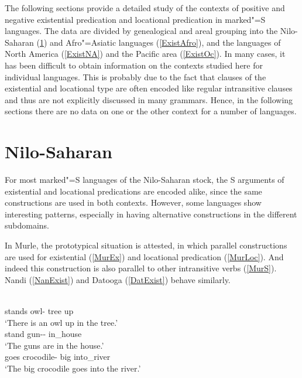 The following sections provide a detailed study of the contexts of positive and negative existential predication and locational predication in marked"=S languages. 
The data are divided by genealogical and areal grouping into the Nilo-Saharan (\ref{ExistNilo}) and Afro"=Asiatic languages (\ref{ExistAfro}), and the languages of North America (\ref{ExistNA}) and the Pacific area (\ref{ExistOc}). 
In many cases, it has been difficult to obtain information on the contexts studied here for individual languages. 
This is probably due to the fact that clauses of the existential and locational type are often encoded like regular intransitive clauses and thus are not explicitly discussed in many grammars. 
Hence, in the following sections there are no data on one or the other context for a number of languages.    

\section{Nilo-Saharan}\label{ExistNilo}

For most marked"=S languages of the Nilo-Saharan stock, the S arguments of existential and locational predications are encoded alike, since the same constructions are used in both contexts. However, some languages show interesting patterns, especially in having alternative constructions in the different subdomains.

In Murle, the prototypical situation is attested, in which parallel constructions are used for existential (\ref{MurEx}) and locational predication (\ref{MurLoc}). 
And indeed this construction is also parallel to other intransitive verbs (\ref{MurS}). 
Nandi (\ref{NanExist}) and Datooga (\ref{DatExist}) behave similarly.

\begin{exe}\ex\label{MurExist}
\begin{xlist}
\ex\label{MurEx} \gll {}   \\
stands owl-\nom{} tree up\\
\glt `There is an owl up in the tree.'
\ex\label{MurLoc}\gll{}  \\
stand gun-\pl{}-\nom{} in\_house\\
\glt `The guns are in the house.'
\ex\label{MurS}\gll{}    \\
goes crocodile-\nom{} \relativ{} big into\_river\\
\glt `The big crocodile goes into the river.'
\end{xlist}
\end{exe} 

